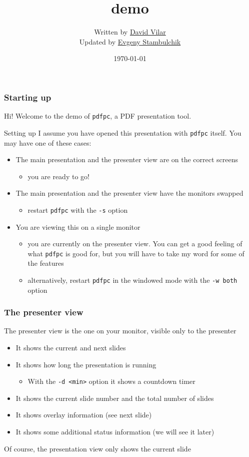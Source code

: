 \documentclass{beamer}
\title{\pdfpc demo}
\author[D. Vilar \& E. Stambulchik]{Written by
                  \href{https://github.com/davvil}{David Vilar} \\
                  Updated by
                  \href{https://github.com/fnevgeny}{Evgeny Stambulchik}}
\date{\today}
\institute{}
\newcommand{\singleitem}[1]{\begin{itemize}\item #1\end{itemize}}
\newcommand{\pdfpc}{\texttt{pdfpc}\xspace}
\newcommand{\opt}[1]{\texttt{#1}\xspace}
\begin{document}
\begin{frame}
  \titlepage
  \hypertarget{titlePage}{}
\end{frame}

\begin{frame}
  \frametitle{Starting up}
  Hi! Welcome to the demo of \pdfpc, a PDF presentation tool.
  \begin{block}{Setting up}
    I assume you have opened this presentation with \pdfpc itself. You may have
    one of these cases:
    \begin{itemize}
      \item The main presentation and the presenter view are on the correct
        screens
          \singleitem{you are ready to go!}
      \item The main presentation and the presenter view have the monitors
        swapped
          \singleitem{restart \pdfpc with the \opt{-s} option}
      \item You are viewing this on a single monitor
        \begin{itemize}
          \item you are currently on the presenter view. You can get a
            good feeling of what \pdfpc is good for, but you will have to take
            my word for some of the features
          \item alternatively, restart \pdfpc in the windowed mode with the
            \opt{-w~both} option
        \end{itemize}
    \end{itemize}
  \end{block}
\end{frame}

\begin{frame}
  \frametitle{The presenter view}
  The presenter view is the one on your monitor, visible only to the presenter
  \begin{itemize}
    \item It shows the current and next slides
    \item It shows how long the presentation is running
      \singleitem{With the \opt{-d <min>} option it shows a countdown timer}
    \item It shows the current slide number and the total number of slides
    \item It shows overlay information (see next slide)
    \item It shows some additional status information (we will see it later)
  \end{itemize}
  Of course, the presentation view only shows the current slide
\end{frame}
\end{document}
